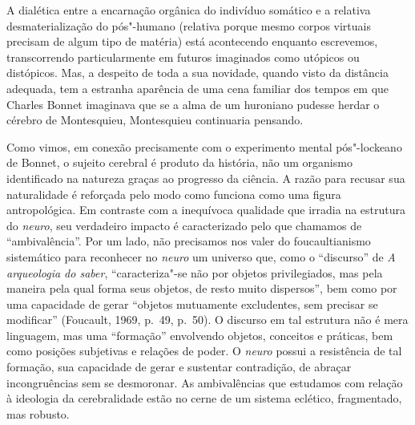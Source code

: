 A dialética entre a encarnação orgânica do indivíduo somático e a
relativa desmaterialização do pós"-humano (relativa porque mesmo corpos
virtuais precisam de algum tipo de matéria) está acontecendo enquanto
escrevemos, transcorrendo particularmente em futuros imaginados como
utópicos ou distópicos. Mas, a despeito de toda a sua novidade, quando
visto da distância adequada, tem a estranha aparência de uma cena
familiar dos tempos em que Charles Bonnet imaginava que se a alma de um
huroniano pudesse herdar o cérebro de Montesquieu, Montesquieu
continuaria pensando.

Como vimos, em conexão precisamente com o experimento mental
pós"-lockeano de Bonnet, o sujeito cerebral é produto da história, não um
organismo identificado na natureza graças ao progresso da ciência. A
razão para recusar sua naturalidade é reforçada pelo modo como funciona
como uma figura antropológica. Em contraste com a inequívoca qualidade
que irradia na estrutura do \emph{neuro}, seu verdadeiro impacto é
caracterizado pelo que chamamos de ``ambivalência''. Por um lado, não
precisamos nos valer do foucaultianismo sistemático para reconhecer no
\emph{neuro} um universo que, como o ``discurso'' de \emph{A arqueologia
do saber}, ``caracteriza"-se não por objetos privilegiados, mas pela
maneira pela qual forma seus objetos, de resto muito dispersos'', bem
como por uma capacidade de gerar ``objetos mutuamente excludentes, sem
precisar se modificar'' (Foucault, 1969, p.~49, p.~50). O discurso em tal
estrutura não é mera linguagem, mas uma ``formação'' envolvendo objetos,
conceitos e práticas, bem como posições subjetivas e relações de poder.
O \emph{neuro} possui a resistência de tal formação, sua capacidade de
gerar e sustentar contradição, de abraçar incongruências sem se
desmoronar. As ambivalências que estudamos com relação à ideologia da
cerebralidade estão no cerne de um sistema eclético, fragmentado, mas
robusto.

